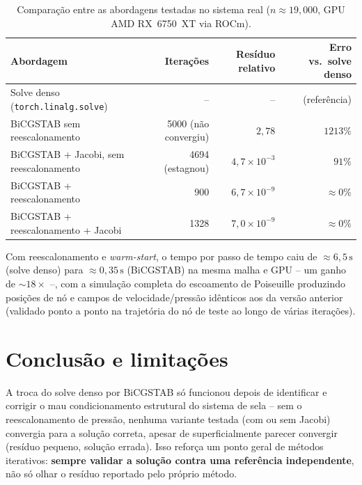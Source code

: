 \documentclass[11pt,a4paper]{article}
\begin{document}
\begin{table}[h]
\centering
\caption{Comparação entre as abordagens testadas no sistema real
($n\approx 19{,}000$, GPU AMD RX~6750~XT via ROCm).}
\begin{tabular}{@{}lrrr@{}}
\toprule
Abordagem & Iterações & Resíduo relativo & Erro vs.\ solve denso \\
\midrule
Solve denso (\texttt{torch.linalg.solve}) & -- & -- & (referência) \\
BiCGSTAB sem reescalonamento & 5000 (não convergiu) & $2{,}78$ & $1213\%$ \\
BiCGSTAB + Jacobi, sem reescalonamento & 4694 (estagnou) & $4{,}7\times10^{-3}$ & $91\%$ \\
BiCGSTAB + reescalonamento & 900 & $6{,}7\times10^{-9}$ & ${\approx}0\%$ \\
BiCGSTAB + reescalonamento + Jacobi & 1328 & $7{,}0\times10^{-9}$ & ${\approx}0\%$ \\
\bottomrule
\end{tabular}
\end{table}

Com reescalonamento e \emph{warm-start}, o tempo por passo de tempo
caiu de ${\approx}6{,}5\,\text{s}$ (solve denso) para
${\approx}0{,}35\,\text{s}$ (BiCGSTAB) na mesma malha e GPU -- um ganho
de ${\sim}18\times$ --, com a simulação completa do escoamento de
Poiseuille produzindo posições de nó e campos de velocidade/pressão
idênticos aos da versão anterior (validado ponto a ponto na trajetória
do nó de teste ao longo de várias iterações).

\section{Conclusão e limitações}

A troca do solve denso por BiCGSTAB só funcionou depois de identificar
e corrigir o mau condicionamento estrutural do sistema de sela --
sem o reescalonamento de pressão, nenhuma variante testada (com ou sem
Jacobi) convergia para a solução correta, apesar de superficialmente
parecer convergir (resíduo pequeno, solução errada). Isso reforça um
ponto geral de métodos iterativos: \textbf{sempre validar a solução
contra uma referência independente}, não só olhar o resíduo reportado
pelo próprio método.
\end{document}
